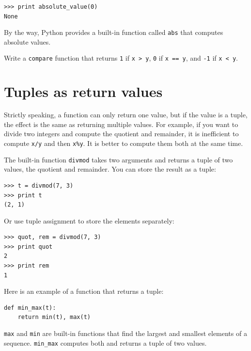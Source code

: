 
\beforeverb
\begin{verbatim}
>>> print absolute_value(0)
None
\end{verbatim}
\afterverb
%
By the way, Python provides a built-in function called 
{\tt abs} that computes absolute values.


\begin{ex}


Write a {\tt compare} function
that returns {\tt 1} if {\tt x > y},
{\tt 0} if {\tt x == y}, and {\tt -1} if {\tt x < y}.
\end{ex}

\section{Tuples as return values}


Strictly speaking, a function can only return one value, but
if the value is a tuple, the effect is the same as returning
multiple values.  For example, if you want to divide two integers
and compute the quotient and remainder, it is inefficient to
compute {\tt x/y} and then {\tt x\%y}.  It is better to compute
them both at the same time.


The built-in function {\tt divmod} takes two arguments and
returns a tuple of two values, the quotient and remainder.
You can store the result as a tuple:

\beforeverb
\begin{verbatim}
>>> t = divmod(7, 3)
>>> print t
(2, 1)
\end{verbatim}
\afterverb
%
Or use tuple assignment to store the elements separately:


\beforeverb
\begin{verbatim}
>>> quot, rem = divmod(7, 3)
>>> print quot
2
>>> print rem
1
\end{verbatim}
\afterverb
%
Here is an example of a function that returns a tuple:

\beforeverb
\begin{verbatim}
def min_max(t):
    return min(t), max(t)
\end{verbatim}
\afterverb
%
{\tt max} and {\tt min} are built-in functions that find
the largest and smallest elements of a sequence.  \verb"min_max"
computes both and returns a tuple of two values.

